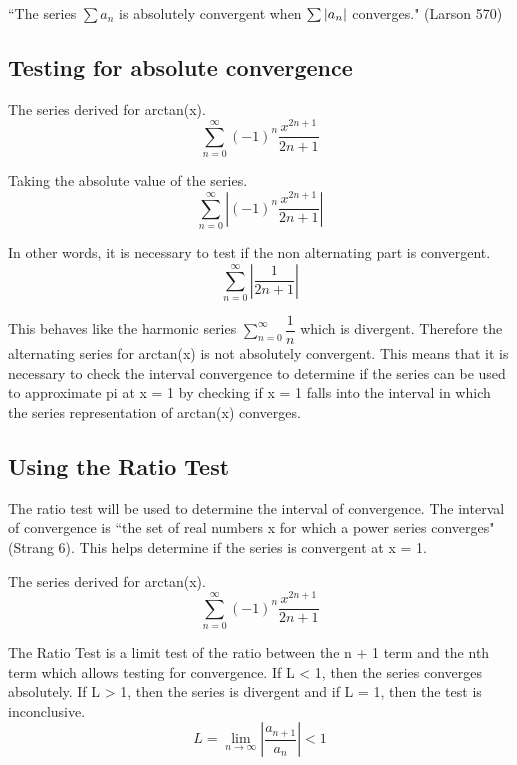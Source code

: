 \documentclass[12pt, titlepage]{article}
\begin{document}
``The series \(\sum a_{n}\) is absolutely convergent when \(\sum \abs{a_{n}}\) converges." (Larson 570)

\subsection{Testing for absolute convergence}
The series derived for arctan(x).
\begin{equation}
    \sum_{n=0}^{\infty} (-1)^{n} \frac{x^{2n+1}}{2n+1}
\end{equation}

Taking the absolute value of the series.
\begin{equation}
    \sum_{n=0}^{\infty}   \left |  (-1)^{n} \frac{x^{2n+1}}{2n+1} \right |
\end{equation}

In other words, it is necessary to test if the non alternating part is convergent.
\begin{equation}
    \sum_{n=0}^{\infty}   \left |\frac{1}{2n+1} \right |
\end{equation}

This behaves like the harmonic series \(\sum\limits_{n=0}^{\infty} \dfrac{1}{n}\) which is divergent. Therefore the alternating series for arctan(x) is not absolutely convergent. This means that it is necessary to check the interval convergence to determine if the series can be used to approximate pi at x = 1 by checking if x = 1 falls into the interval in which the series representation of arctan(x) converges.

\subsection{Using the Ratio Test}
The ratio test will be used to determine the interval of convergence. The interval of convergence is ``the set of real numbers x for which a power series converges" (Strang 6). This helps determine if the series is convergent at x = 1.

The series derived for arctan(x).
\begin{equation}
    \sum_{n=0}^{\infty} (-1)^{n} \frac{x^{2n+1}}{2n+1}
\end{equation}
 
The Ratio Test is a limit test of the ratio between the n + 1 term and the nth term which allows testing for convergence. If L < 1, then the series converges absolutely. If L > 1, then the series is divergent and if L = 1, then the test is inconclusive.
\begin{equation}
    L = \lim_{n \to \infty} \left |\frac{a_{n+1}}{a_{n}} \right | < 1
\end{equation}
\end{document}
